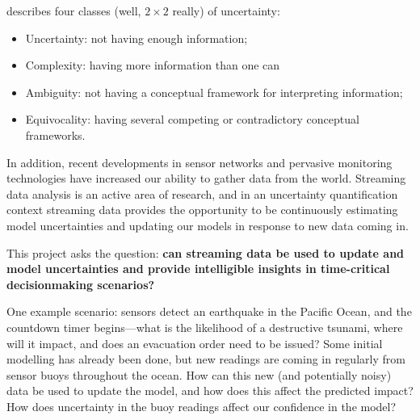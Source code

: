 \documentclass[a4paper,fontsize=12pt]{scrartcl}
\begin{document}
\appendix
\newpage





\textcite{zack_role_2007} describes four classes (well, $2\times2$ really) of uncertainty:
\begin{itemize}
\item Uncertainty: not having enough information;
\item Complexity: having more information than one can
\item Ambiguity: not having a conceptual framework for interpreting
  information;
\item Equivocality: having several competing or contradictory
  conceptual frameworks.
\end{itemize}

In addition, recent developments in sensor networks and pervasive
monitoring technologies have increased our ability to gather data from
the world. Streaming data analysis is an active area of research, and
in an uncertainty quantification context streaming data provides the
opportunity to be continuously estimating model uncertainties and
updating our models in response to new data coming in.

This project asks the question: \textbf{can streaming data be used to
  update and model uncertainties and provide intelligible insights in
  time-critical decisionmaking scenarios?}

One example scenario: sensors detect an earthquake in the Pacific Ocean,
and the countdown timer begins---what is the likelihood of a
destructive tsunami, where will it impact, and does an evacuation
order need to be issued? Some initial modelling has already been done,
but new readings are coming in regularly from sensor buoys throughout
the ocean. How can this new (and potentially noisy) data be used to
update the model, and how does this affect the predicted impact? How
does uncertainty in the buoy readings affect our confidence in the
model?

\end{document}
